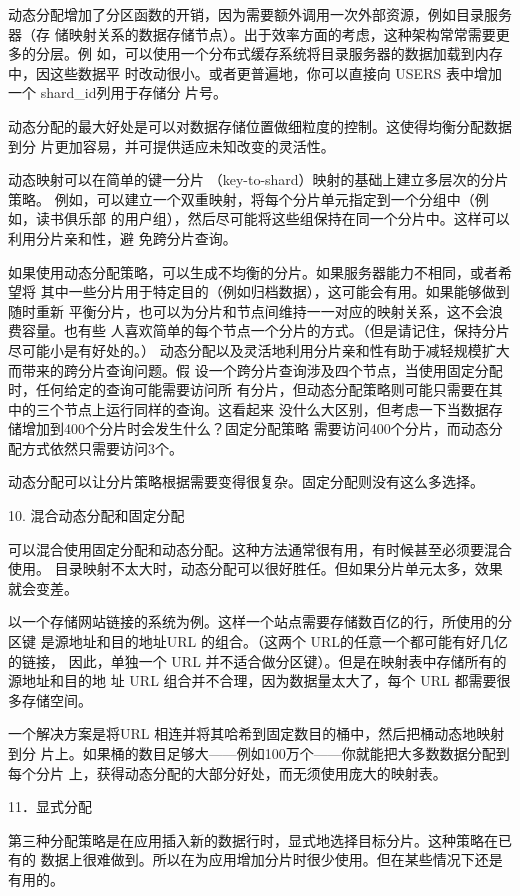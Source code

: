 动态分配增加了分区函数的开销，因为需要额外调用一次外部资源，例如目录服务器（存
储映射关系的数据存储节点）。出于效率方面的考虑，这种架构常常需要更多的分层。例
如，可以使用一个分布式缓存系统将目录服务器的数据加载到内存中，因这些数据平
时改动很小。或者更普遍地，你可以直接向 USERS 表中增加一个 shard\_id列用于存储分
片号。

动态分配的最大好处是可以对数据存储位置做细粒度的控制。这使得均衡分配数据到分
片更加容易，并可提供适应未知改变的灵活性。

动态映射可以在简单的键一分片 （key-to-shard）映射的基础上建立多层次的分片策略。
例如，可以建立一个双重映射，将每个分片单元指定到一个分组中（例如，读书俱乐部
的用户组），然后尽可能将这些组保持在同一个分片中。这样可以利用分片亲和性，避
免跨分片查询。

如果使用动态分配策略，可以生成不均衡的分片。如果服务器能力不相同，或者希望将
其中一些分片用于特定目的（例如归档数据），这可能会有用。如果能够做到随时重新
平衡分片，也可以为分片和节点间维持一一对应的映射关系，这不会浪费容量。也有些
人喜欢简单的每个节点一个分片的方式。（但是请记住，保持分片尽可能小是有好处的。）
动态分配以及灵活地利用分片亲和性有助于减轻规模扩大而带来的跨分片查询问题。假
设一个跨分片查询涉及四个节点，当使用固定分配时，任何给定的查询可能需要访问所
有分片，但动态分配策略则可能只需要在其中的三个节点上运行同样的查询。这看起来
没什么大区别，但考虑一下当数据存储增加到400个分片时会发生什么？固定分配策略
需要访问400个分片，而动态分配方式依然只需要访问3个。

动态分配可以让分片策略根据需要变得很复杂。固定分配则没有这么多选择。

10. 混合动态分配和固定分配

可以混合使用固定分配和动态分配。这种方法通常很有用，有时候甚至必须要混合使用。
目录映射不太大时，动态分配可以很好胜任。但如果分片单元太多，效果就会变差。

以一个存储网站链接的系统为例。这样一个站点需要存储数百亿的行，所使用的分区键
是源地址和目的地址URL 的组合。（这两个 URL的任意一个都可能有好几亿的链接，
因此，单独一个 URL 并不适合做分区键）。但是在映射表中存储所有的源地址和目的地
址 URL 组合并不合理，因为数据量太大了，每个 URL 都需要很多存储空间。

一个解决方案是将URL 相连并将其哈希到固定数目的桶中，然后把桶动态地映射到分
片上。如果桶的数目足够大——例如100万个——你就能把大多数数据分配到每个分片
上，获得动态分配的大部分好处，而无须使用庞大的映射表。

11．显式分配

第三种分配策略是在应用插入新的数据行时，显式地选择目标分片。这种策略在已有的
数据上很难做到。所以在为应用增加分片时很少使用。但在某些情况下还是有用的。

